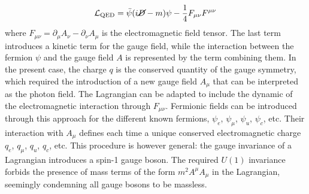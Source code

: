 \begin{equation}
    \mathcal{L}_{\text{QED}} = \bar{\psi} (i \cancel{D}- m) \psi - \frac{1}{4} F_{\mu\nu} F^{\mu\nu}
\end{equation}
where $F_{\mu\nu} = \partial_{\mu} A_\nu - \partial_\nu A_{\mu} $ is the electromagnetic field tensor. The last term introduces a kinetic term for the gauge field, while the interaction between the fermion $\psi$ and the gauge field $A$ is represented by the term combining them. In the present case, the charge $q$ is the conserved quantity of the gauge symmetry, which required the introduction of a new gauge field $A_\mu$ that can be interpreted as the photon field. The Lagrangian can be adapted to include the dynamic of the electromagnetic interaction through $F_{\mu\nu}$. Fermionic fields can be introduced through this approach for the different known fermions, $\psi_e$, $\psi_{\mu}$, $\psi_u$, $\psi_c$, etc. Their interaction with $A_\mu$ defines each time a unique conserved electromagnetic charge $q_e$, $q_{\mu}$, $q_u$, $q_c$, etc. This procedure is however general: the gauge invariance of a Lagrangian introduces a spin-1 gauge boson. The required $U(1)$ invariance forbids the presence of mass terms of the form $m^2 A^{\mu} A_{\mu}$ in the Lagrangian, seemingly condemning all gauge bosons to be massless. 

